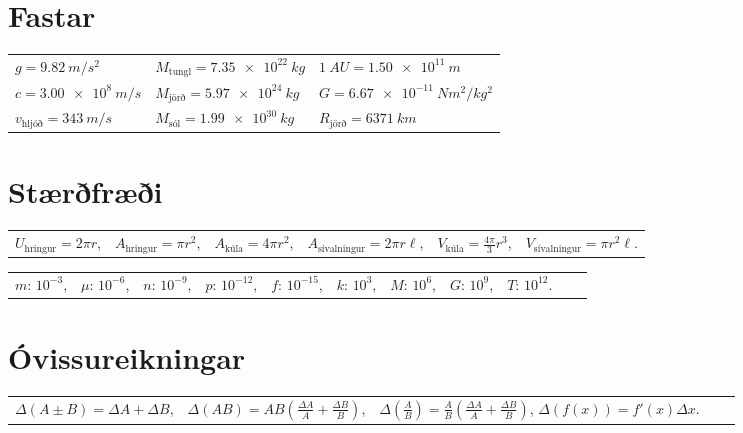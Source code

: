 \section*{Fastar}

\begin{table}[H]
\begin{tabular}{lll}
$g = \SI{9.82}{m/s^2}$ & $M_{\text{tungl}} = \SI{7.35e22}{kg}$ & $\SI{1}{AU} = \SI{1.50e11}{m}$  \\
$c = \SI{3.00e8}{m/s}$         & $M_{\text{jörð}} = \SI{5.97e24}{kg}$  & $G = \SI{6.67e-11}{Nm^2/kg^2}$ \\
$v_{\text{hljóð}} =   \SI{343}{m/s}$ & $M_{\text{sól}} = \SI{1.99e30}{kg}$  & 
$R_{\text{jörð}} = \SI{6371}{km}$
\end{tabular}
\end{table}

\section*{Stærðfræði}

\begin{table}[H]
\begin{tabular}{llllll}
$U_{\text{hringur}} = 2\pi r$,  & $A_{\text{hringur}} = \pi r^2$, & $A_{\text{kúla}} = 4\pi r^2$, & $A_{\text{sívalningur}} = 2\pi r \ell$, & $V_{\text{kúla}} = \frac{4\pi}{3}r^3$, & $V_{\text{sívalningur}} = \pi r^2 \ell$.
\end{tabular}
\end{table}

\begin{table}[H]
\begin{tabular}{lllllllllll}
$m$: $10^{-3}$,  & $\mu$: $10^{-6}$, & $n$: $10^{-9}$, & $p$: $10^{-12}$, & $f$: $10^{-15}$, & $k$: $10^3$, & $M$: $10^6$, & $G$: $10^9$, & $T$: $10^{12}$.
\end{tabular}
\end{table}


\section*{Óvissureikningar}

\begin{table}[H]
\begin{tabular}{lllll}
$\Delta\left(A \pm B \right) = \Delta A + \Delta B$, & $\Delta \left( AB \right) = AB\left( \frac{\Delta A}{A} + \frac{\Delta B}{B} \right)$, & $\Delta \left( \frac{A}{B} \right) = \frac{A}{B}\left( \frac{\Delta A}{A} + \frac{\Delta B}{B} \right)$, $\Delta(f(x)) = f'(x) \Delta x$.
\end{tabular}
\end{table}



